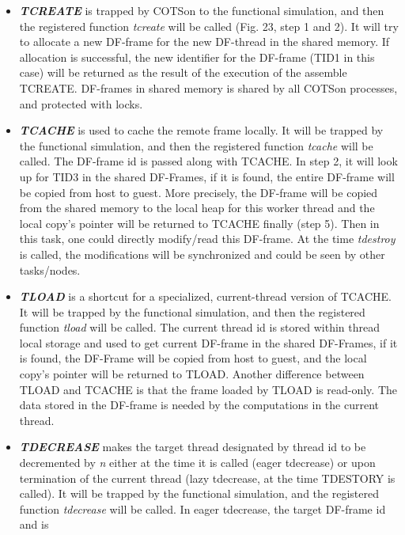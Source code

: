 \documentclass[a4paper]{article}
\begin{document}
\begin{itemize}
\item {
\textbf{\textit{TCREATE}} is trapped by COTSon to the functional
simulation, and then the registered function \textit{tcreate} will be
called (Fig. 23, step 1 and 2). It will try to allocate a new DF-frame
for the new DF-thread in the shared memory. If allocation is
successful, the new identifier for the DF-frame (TID1 in this case)
will be returned as the result of the execution of the assemble
TCREATE. DF-frames in shared memory is shared by all COTSon processes,
and protected with locks.}
\item {
\textbf{\textit{TCACHE}} is used to cache the remote frame locally. It
will be trapped by the functional simulation, and then the registered
function \textit{tcache} will be called. The DF-frame id is passed
along with TCACHE. In step 2, it will look up for TID3 in the shared
DF-Frames, if it is found, the entire DF-frame will be copied from host
to guest. More precisely, the DF-frame will be copied from the shared
memory to the local heap for this worker thread and the local
copy{\textquoteright}s pointer will be returned to TCACHE finally (step
5). Then in this task, one could directly modify/read this DF-frame. At
the time \textit{tdestroy} is called, the modifications will be
synchronized and could be seen by other tasks/nodes.}
\item {
\textbf{\textit{TLOAD}} is a shortcut for a specialized, current-thread
version of TCACHE. It will be trapped by the functional simulation, and
then the registered function \textit{tload} will be called. The current
thread id is stored within thread local storage and used to get current
DF-frame in the shared DF-Frames, if it is found, the DF-Frame will be
copied from host to guest, and the local copy{\textquoteright}s pointer
will be returned to TLOAD. Another difference between TLOAD and TCACHE
is that the frame loaded by TLOAD is read-only. The data stored in the
DF-frame is needed by the computations in the current thread.}
\item {
\textbf{\textit{TDECREASE}} makes the target thread designated by thread
id to be decremented by \textit{n} either at the time it is called
(eager tdecrease) or upon termination of the current thread (lazy
tdecrease, at the time TDESTORY is called). It will be trapped by the
functional simulation, and the registered function \textit{tdecrease}
will be called. In eager tdecrease, the target DF-frame id and is
}
\end{itemize}
\end{document}
